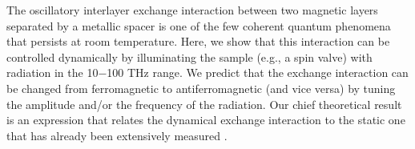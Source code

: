 The oscillatory interlayer exchange interaction between two magnetic layers separated by a metallic spacer is one of the few coherent quantum phenomena that persists at room temperature. Here, we show that this interaction can be controlled dynamically by illuminating the sample (e.g., a spin valve) with radiation in the 10$-$100 THz range. We predict that the exchange interaction can be changed from ferromagnetic to antiferromagnetic (and vice versa) by tuning the amplitude and/or the frequency of the radiation. Our chief theoretical result is an expression that relates the dynamical exchange interaction to the static one that has already been extensively measured \cite{Meyer_2017}.